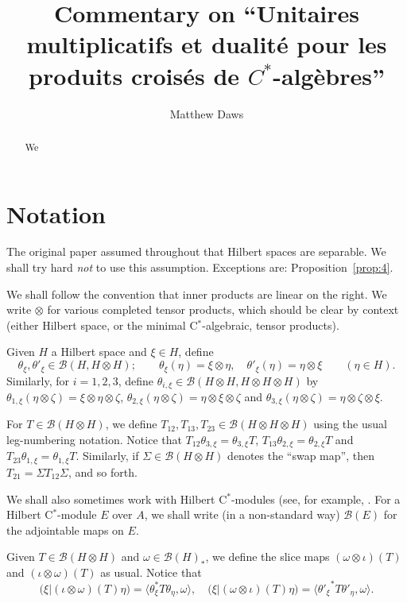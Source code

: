 \documentclass[a4paper,12pt]{article}
\theoremstyle{plain}
\theoremstyle{definition}
\newcommand{\ip}[2]{{\langle {#1} , {#2} \rangle}}
\newcommand{\mc}{\mathcal}
\begin{document}
\title{Commentary on ``Unitaires multiplicatifs et dualit\'e pour les
produits crois\'es de $C^*$-alg\`ebres''}
\author{Matthew Daws}
\maketitle

\begin{abstract}
We 
\end{abstract}

\section{Notation}

The original paper assumed throughout that Hilbert spaces are separable.
We shall try hard \emph{not} to use this assumption.  Exceptions are:
Proposition~\ref{prop:4}.

We shall follow the convention that inner products are linear on the right.
We write $\otimes$ for various completed tensor products, which should
be clear by context (either Hilbert space, or the minimal C$^*$-algebraic,
tensor products).

Given $H$ a Hilbert space and $\xi\in H$, define
\[ \theta_\xi, \theta'_\xi\in\mc B(H,H\otimes H); \qquad
\theta_\xi(\eta) = \xi\otimes\eta, \quad
\theta'_\xi(\eta) = \eta\otimes\xi \qquad (\eta\in H). \]
Similarly, for $i=1,2,3$, define $\theta_{i,\xi}\in\mc B(H\otimes H,
H\otimes H\otimes H)$ by $\theta_{1,\xi}(\eta\otimes\zeta)
= \xi\otimes\eta\otimes\zeta$, $\theta_{2,\xi}(\eta\otimes\zeta)
= \eta\otimes\xi\otimes\zeta$ and $\theta_{3,\xi}(\eta\otimes\zeta)
= \eta\otimes\zeta\otimes\xi$.

For $T\in\mc B(H\otimes H)$, we define $T_{12}, T_{13}, T_{23} \in
\mc B(H\otimes H\otimes H)$ using the usual leg-numbering notation.
Notice that $T_{12} \theta_{3,\xi} = \theta_{3,\xi} T$,
$T_{13} \theta_{2,\xi} = \theta_{2,\xi} T$ and
$T_{23} \theta_{1,\xi} = \theta_{1,\xi} T$.  Similarly, if
$\Sigma\in\mc B(H\otimes H)$ denotes the ``swap map'', then
$T_{21} = \Sigma T_{12} \Sigma$, and so forth.

We shall also sometimes work with Hilbert C$^*$-modules (see,
for example, \cite{lance}.  For a Hilbert C$^*$-module $E$ over $A$,
we shall write (in a non-standard way) $\mc B(E)$ for the adjointable
maps on $E$.

Given $T\in\mc B(H\otimes H)$ and $\omega\in \mc B(H)_*$, we define
the slice maps $(\omega\otimes\iota)(T)$ and $(\iota\otimes\omega)(T)$
as usual.  Notice that
\[ \big( \xi \big| (\iota\otimes\omega)(T) \eta \big)
= \ip{\theta_\xi^* T \theta_\eta}{\omega}, \quad
\big( \xi \big| (\omega\otimes\iota)(T) \eta \big)
= \ip{{\theta'_\xi}^* T \theta'_\eta}{\omega}. \]
\end{document}
